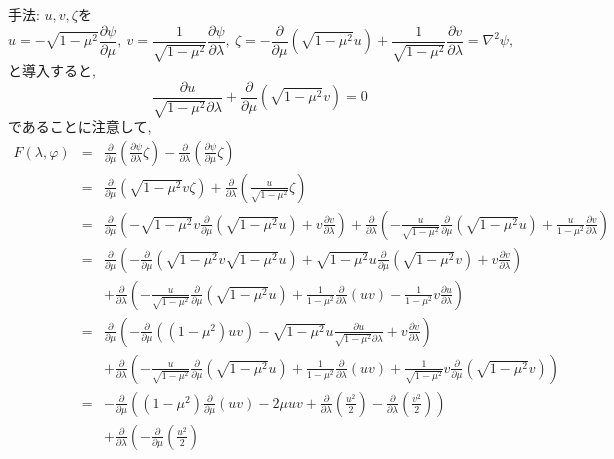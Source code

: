 \documentclass[a4j]{jarticle}
\begin{document}
\begin{enumerate}
手法:
$u,v,\zeta$を
\[
u=-\sqrt{1-\mu^2}\frac{\partial\psi}{\partial\mu},
\ v=\frac{1}{\sqrt{1-\mu^2}}\frac{\partial\psi}{\partial\lambda},
\ \zeta=-\frac{\partial}{\partial\mu}\left(\sqrt{1-\mu^2}u\right)
+\frac{1}{\sqrt{1-\mu^2}}\frac{\partial v}{\partial\lambda}
=\nabla^2\psi,
\]
と導入すると,
\[
\frac{\partial u}{\sqrt{1-\mu^2}\partial\lambda}+
\frac{\partial}{\partial\mu}(\sqrt{1-\mu^2}v)
=0
\]
であることに注意して,
\begin{eqnarray*}
F(\lambda,\varphi)
&=&
\frac{\partial}{\partial\mu}
\left(\frac{\partial\psi}{\partial\lambda}\zeta\right)
-\frac{\partial}{\partial\lambda}
\left(\frac{\partial\psi}{\partial\mu}\zeta\right)\\
&=&
\frac{\partial}{\partial\mu}
\left(\sqrt{1-\mu^2}v\zeta\right)
+\frac{\partial}{\partial\lambda}
\left(\frac{u}{\sqrt{1-\mu^2}}\zeta\right)\\
&=&
\frac{\partial}{\partial\mu}
\left(-\sqrt{1-\mu^2}v\frac{\partial}{\partial\mu}(\sqrt{1-\mu^2}u)
+v\frac{\partial v}{\partial\lambda}\right)
+\frac{\partial}{\partial\lambda}
\left(-\frac{u}{\sqrt{1-\mu^2}}\frac{\partial}{\partial\mu}
(\sqrt{1-\mu^2}u)+\frac{u}{1-\mu^2}
\frac{\partial v}{\partial\lambda}
\right)\\
&=&
\frac{\partial}{\partial\mu}
\left(
-\frac{\partial}{\partial\mu}(\sqrt{1-\mu^2}v \sqrt{1-\mu^2}u)
+\sqrt{1-\mu^2}u\frac{\partial}{\partial\mu}(\sqrt{1-\mu^2}v)
+v\frac{\partial v}{\partial\lambda}\right)\\
& & +\frac{\partial}{\partial\lambda}
\left(-\frac{u}{\sqrt{1-\mu^2}}\frac{\partial}{\partial\mu}
(\sqrt{1-\mu^2}u)
+\frac{1}{1-\mu^2}\frac{\partial}{\partial\lambda}(uv)
-\frac{1}{1-\mu^2}v\frac{\partial u}{\partial\lambda}
\right)\\
&=&
\frac{\partial}{\partial\mu}
\left(
-\frac{\partial}{\partial\mu}((1-\mu^2)uv)
-\sqrt{1-\mu^2}u\frac{\partial u}{\sqrt{1-\mu^2}\partial\lambda}
+v\frac{\partial v}{\partial\lambda}\right)\\
& & +\frac{\partial}{\partial\lambda}
\left(-\frac{u}{\sqrt{1-\mu^2}}\frac{\partial}{\partial\mu}
(\sqrt{1-\mu^2}u)
+\frac{1}{1-\mu^2}\frac{\partial}{\partial\lambda}(uv)
+\frac{1}{\sqrt{1-\mu^2}}v
\frac{\partial}{\partial\mu}(\sqrt{1-\mu^2}v)
\right)\\
&=&
-\frac{\partial}{\partial\mu}
\left(
(1-\mu^2)\frac{\partial}{\partial\mu}(uv)
-2\mu uv+\frac{\partial}{\partial\lambda}(\frac{u^2}2)
-\frac{\partial}{\partial\lambda}(\frac{v^2}2)
\right)\\
& &
+\frac{\partial}{\partial\lambda}
\left(
-\frac{\partial}{\partial\mu}(\frac{u^2}2)

\end{eqnarray*}
\end{enumerate}
\end{document}
